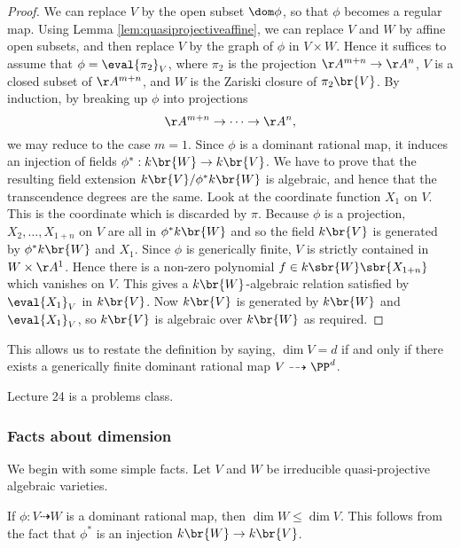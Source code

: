 \begin{proof}
We can replace $ V $ by the open subset $ \dom \phi $, so that $ \phi $ becomes a regular map. Using Lemma \ref{lem:quasiprojectiveaffine}, we can replace $ V $ and $ W $ by affine open subsets, and then replace $ V $ by the graph of $ \phi $ in $ V \times W $. Hence it suffices to assume that $ \phi = \eval{\pi_2}_V $, where $ \pi_2 $ is the projection $ \AA^{m + n} \to \AA^n $, $ V $ is a closed subset of $ \AA^{m + n} $, and $ W $ is the Zariski closure of $ \pi_2\br{V} $. By induction, by breaking up $ \phi $ into projections
$$ \AA^{m + n} \to \dots \to \AA^n, $$
we may reduce to the case $ m = 1 $. Since $ \phi $ is a dominant rational map, it induces an injection of fields $ \phi^* : k\br{W} \to k\br{V} $. We have to prove that the resulting field extension $ k\br{V} / \phi^*k\br{W} $ is algebraic, and hence that the transcendence degrees are the same. Look at the coordinate function $ X_1 $ on $ V $. This is the coordinate which is discarded by $ \pi $. Because $ \phi $ is a projection, $ X_2, \dots, X_{1 + n} $ on $ V $ are all in $ \phi^*k\br{W} $ and so the field $ k\br{V} $ is generated by $ \phi^*k\br{W} $ and $ X_1 $. Since $ \phi $ is generically finite, $ V $ is strictly contained in $ W \times \AA^1 $. Hence there is a non-zero polynomial $ f \in k\sbr{W}\sbr{X_{1 + n}} $ which vanishes on $ V $. This gives a $ k\br{W} $-algebraic relation satisfied by $ \eval{X_1}_V $ in $ k\br{V} $. Now $ k\br{V} $ is generated by $ k\br{W} $ and $ \eval{X_1}_V $, so $ k\br{V} $ is algebraic over $ k\br{W} $ as required.
\end{proof}

This allows us to restate the definition by saying, $ \dim V = d $ if and only if there exists a generically finite dominant rational map $ V \dashrightarrow \PP^d $.


Lecture 24 is a problems class.

\subsubsection{Facts about dimension}


We begin with some simple facts. Let $ V $ and $ W $ be irreducible quasi-projective algebraic varieties.

\begin{fact*}
If $ \phi : V \dashrightarrow W $ is a dominant rational map, then $ \dim W \le \dim V $. This follows from the fact that $ \phi^* $ is an injection $ k\br{W} \to k\br{V} $.
\end{fact*}

